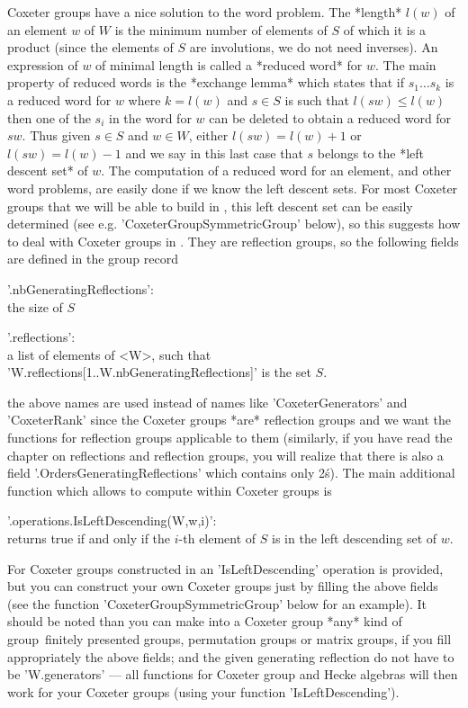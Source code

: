 Coxeter  groups  have  a  nice  solution  to the word problem. The *length*
$l(w)$ of an element $w$ of $W$ is the minimum number of elements of $S$ of
which it is a product (since the elements of $S$ are involutions, we do not
need inverses). An expression of $w$ of minimal length is called a *reduced
word*  for $w$. The main property of  reduced words is the *exchange lemma*
which  states  that  if  $s_1\ldots  s_k$  is  a reduced word for $w$ where
$k=l(w)$ and $s\in S$ is such that $l(sw)\le l(w)$ then one of the $s_i$ in
the  word for $w$  can be deleted  to obtain a  reduced word for $sw$. Thus
given $s\in S$ and $w\in W$, either $l(sw)=l(w)+1$ or $l(sw)=l(w)-1$ and we
say  in this last case  that $s$ belongs to  the *left descent set* of $w$.
The  computation of a reduced word for an element, and other word problems,
are  easily done if we know the  left descent sets. For most Coxeter groups
that  we will  be able  to build  in \CHEVIE,  this left descent set can be
easily  determined (see  e.g. 'CoxeterGroupSymmetricGroup'  below), so this
suggests  how to deal with Coxeter groups in {\CHEVIE}. They are reflection
groups, so the following fields are defined in the group record\:

'.nbGeneratingReflections':\\ the size of $S$

'.reflections':\\ a list of elements of <W>, such
     that 'W.reflections{[1..W.nbGeneratingReflections]}' is the set $S$.

the above names  are used instead of names  like 'CoxeterGenerators' and
'CoxeterRank' since  the Coxeter groups  *are* reflection groups  and we
want the functions for reflection  groups applicable to them (similarly,
if you have  read the chapter on reflections and  reflection groups, you
will realize  that there is also  a field '.OrdersGeneratingReflections'
which contains only 2\'s). The  main additional function which allows to
compute within Coxeter groups is\:

'.operations.IsLeftDescending(W,w,i)':\\ returns true if and only if the
      $i$-th element of $S$ is in the left descending set of $w$.

For Coxeter groups constructed in {\CHEVIE} an 'IsLeftDescending' operation
is  provided, but you can construct your own Coxeter groups just by filling
the  above fields (see the  function 'CoxeterGroupSymmetricGroup' below for
an  example). It  should be  noted than  you can  make into a Coxeter group
*any*  kind of  group\:\ finitely  presented groups,  permutation groups or
matrix  groups, if you  fill appropriately the  above fields; and the given
generating  reflection do not  have to be  'W.generators' --- all functions
for Coxeter group and Hecke algebras will then work for your Coxeter groups
(using your function 'IsLeftDescending').

